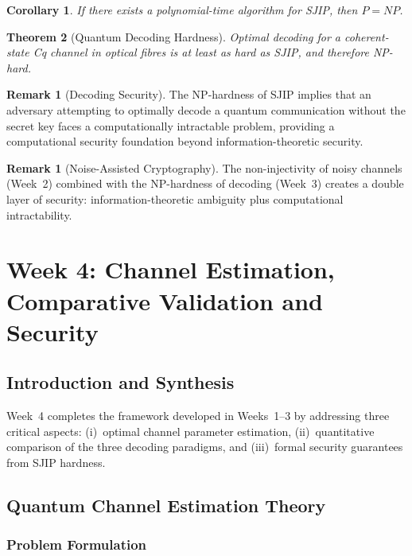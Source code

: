 \documentclass[journal,twocolumn]{IEEEtran}
\theoremstyle{definition}
\newtheorem{remark}[definition]{Remark}
\theoremstyle{plain}
\newtheorem{theorem}{Theorem}[section]
\newtheorem{corollary}[theorem]{Corollary}
\begin{document}
\begin{corollary}
If there exists a polynomial-time algorithm for SJIP, then $P=NP$.
\end{corollary}

\begin{theorem}[Quantum Decoding Hardness]
Optimal decoding for a coherent-state Cq channel in optical fibres is
at least as hard as SJIP, and therefore NP-hard.
\end{theorem}

\begin{remark}[Decoding Security]
The NP-hardness of SJIP implies that an adversary attempting to
optimally decode a quantum communication without the secret key faces a
computationally intractable problem, providing a computational security
foundation beyond information-theoretic security.
\end{remark}

\begin{remark}[Noise-Assisted Cryptography]
The non-injectivity of noisy channels (Week~2) combined with the
NP-hardness of decoding (Week~3) creates a double layer of security:
information-theoretic ambiguity plus computational intractability.
\end{remark}

\section{Week 4: Channel Estimation, Comparative Validation and Security}

\subsection{Introduction and Synthesis}

Week~4 completes the framework developed in Weeks~1--3 by addressing
three critical aspects: (i)~optimal channel parameter estimation,
(ii)~quantitative comparison of the three decoding paradigms, and
(iii)~formal security guarantees from SJIP hardness.

\subsection{Quantum Channel Estimation Theory}
\label{sec:week4_estimation}

\subsubsection{Problem Formulation}
\end{document}
